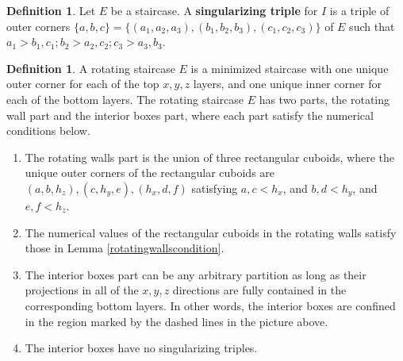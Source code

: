 \documentclass{amsart}[10pt]
\theoremstyle{plain}
\theoremstyle{definition}
\newtheorem{definition}[theorem]{Definition}
\begin{document}
\begin{definition} 
\cite{AJR1}
Let $E$ be a staircase. A \textbf{singularizing triple} for $I$ is a triple of outer corners $\{a,b,c\}=\{(a_1, a_2, a_3), (b_1, b_2, b_3), (c_1, c_2, c_3)\}$ of $E$ such that $a_1 > b_1,c_1; b_2 > a_2,c_2; c_3 > a_3,b_3.$
\end{definition}



\begin{definition}
\label{rot_stair_def}
A rotating staircase $E$ is a minimized staircase with one unique outer corner for each of the top $x,y,z$ layers, and one unique inner corner for each of the bottom layers. The rotating staircase $E$ has two parts, the rotating wall part and the interior boxes part, where each part satisfy the numerical conditions below.

\begin{enumerate}
\item The rotating walls part is the union of three rectangular cuboids, where the unique outer corners of the rectangular cuboids are $(a,b, h_z),(c,h_y, e), (h_x,d, f)$ satisfying $a,c < h_x$, and $b,d < h_y$, and $e,f < h_z$. 

\item \label{rot_stair_2} The numerical values of the rectangular cuboids in the rotating walls satisfy those in Lemma \ref{rotatingwallscondition}.

\item The interior boxes part can be any arbitrary partition as long as their projections in all of the $x,y,z$ directions are fully contained in the corresponding bottom layers. In other words, the interior boxes are confined in the region marked by the dashed lines in the picture above.


\item \label{rot_stair_4} The interior boxes have no singularizing triples.
\end{enumerate}


\end{definition}
\end{document}
